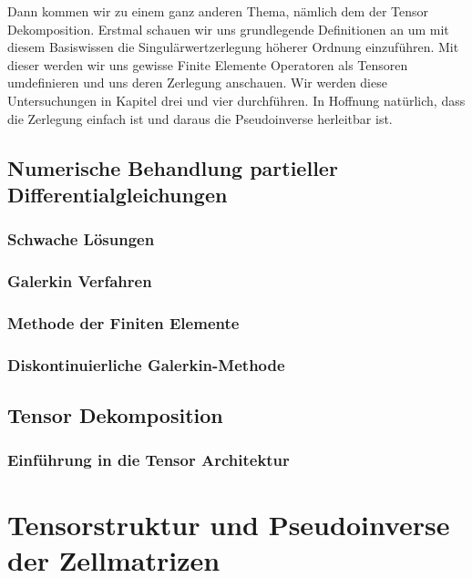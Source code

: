 \documentclass[12pt,a4paper]{scrartcl}
\numberwithin{equation}{section}
\begin{document}
Dann kommen wir zu einem ganz anderen Thema, nämlich dem der Tensor Dekomposition. 
Erstmal schauen wir uns grundlegende Definitionen an um mit diesem Basiswissen die Singulärwertzerlegung höherer Ordnung einzuführen. Mit dieser werden wir uns gewisse Finite Elemente Operatoren als Tensoren umdefinieren und uns deren Zerlegung anschauen. Wir werden diese Untersuchungen in Kapitel drei und vier durchführen. In Hoffnung natürlich, dass die Zerlegung einfach ist und daraus die Pseudoinverse herleitbar ist.


\subsection{Numerische Behandlung partieller Differentialgleichungen}
\subsubsection{Schwache Lösungen}


\subsubsection{Galerkin Verfahren}


\subsubsection{Methode der Finiten Elemente}


\subsubsection{Diskontinuierliche Galerkin-Methode}


\newpage
\subsection{Tensor Dekomposition}
\subsubsection{Einführung in die Tensor Architektur}




\newpage
\section{Tensorstruktur und Pseudoinverse der Zellmatrizen }
\end{document}
